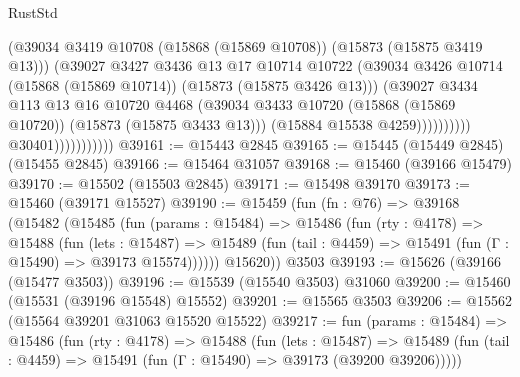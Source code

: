 \begin{lexlean}{RustStd}
\begin{coremodule}
                                        (@39034
                                          @3419
                                          @10708
                                          (@15868 (@15869 @10708))
                                          (@15873 (@15875 @3419 @13)))
                                        (@39027
                                          @3427
                                          @3436
                                          @13
                                          @17
                                          @10714
                                          @10722
                                          (@39034
                                            @3426
                                            @10714
                                            (@15868 (@15869 @10714))
                                            (@15873 (@15875 @3426 @13)))
                                          (@39027
                                            @3434
                                            @113
                                            @13
                                            @16
                                            @10720
                                            @4468
                                            (@39034
                                              @3433
                                              @10720
                                              (@15868 (@15869 @10720))
                                              (@15873 (@15875 @3433 @13)))
                                            (@15884 @15538 @4259))))))))))
                          @30401)))))))))))
@39161 := @15443 @2845
@39165 := @15445 (@15449 @2845) (@15455 @2845)
@39166 := @15464 @31057
@39168 := @15460 (@39166 @15479)
@39170 := @15502 (@15503 @2845)
@39171 := @15498 @39170
@39173 := @15460 (@39171 @15527)
@39190 := @15459
    (fun (fn : @76) =>
    @39168
      (@15482
        (@15485
          (fun (params : @15484) =>
          @15486
            (fun (rty : @4178) =>
            @15488
              (fun (lets : @15487) =>
              @15489 (fun (tail : @4459) => @15491 (fun (Γ : @15490) => @39173 @15574))))))
        @15620))
    @3503
@39193 := @15626 (@39166 (@15477 @3503))
@39196 := @15539 (@15540 @3503) @31060
@39200 := @15460 (@15531 (@39196 @15548) @15552)
@39201 := @15565 @3503
@39206 := @15562 (@15564 @39201 @31063 @15520 @15522)
@39217 := fun (params : @15484) =>
  @15486
    (fun (rty : @4178) =>
    @15488
      (fun (lets : @15487) =>
      @15489 (fun (tail : @4459) => @15491 (fun (Γ : @15490) => @39173 (@39200 @39206)))))

\end{coremodule}
\end{lexlean}
